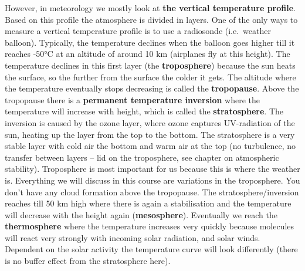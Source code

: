 \documentclass[oneside]{book}
\begin{document}
However, in meteorology we mostly look at \textbf{the vertical
temperature profile}. Based on this profile the atmosphere is divided in
layers. One of the only ways to measure a vertical temperature profile
is to use a radiosonde (i.e.~weather balloon). Typically, the
temperature declines when the balloon goes higher till it reaches -50°C
at an altitude of around 10 km (airplanes fly at this height). The
temperature declines in this first layer (the \textbf{troposphere})
because the sun heats the surface, so the further from the surface the
colder it gets. The altitude where the temperature eventually stops
decreasing is called the \textbf{tropopause}. Above the tropopause there
is a \textbf{permanent temperature inversion} where the temperature will
increase with height, which is called the \textbf{stratosphere}. The
inversion is caused by the ozone layer, where ozone captures
UV-radiation of the sun, heating up the layer from the top to the
bottom. The stratosphere is a very stable layer with cold air the bottom
and warm air at the top (no turbulence, no transfer between layers --
lid on the troposphere, see chapter on atmospheric stability).
Troposphere is most important for us because this is where the weather
is. Everything we will discuss in this course are variations in the
troposphere. You don't have any cloud formation above the tropopause.
The stratosphere/inversion reaches till 50 km high where there is again
a stabilisation and the temperature will decrease with the height again
(\textbf{mesosphere}). Eventually we reach the \textbf{thermosphere}
where the temperature increases very quickly because molecules will
react very strongly with incoming solar radiation, and solar winds.
Dependent on the solar activity the temperature curve will look
differently (there is no buffer effect from the stratosphere here).
\end{document}
